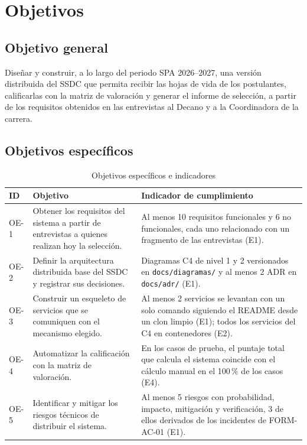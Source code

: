 \section{Objetivos}

\subsection{Objetivo general}
Diseñar y construir, a lo largo del periodo SPA 2026--2027, una versión distribuida del
SSDC que permita recibir las hojas de vida de los postulantes, calificarlas con la matriz
de valoración y generar el informe de selección, a partir de los requisitos obtenidos en
las entrevistas al Decano y a la Coordinadora de la carrera.

\subsection{Objetivos específicos}

\begin{table}[H]
\centering
\small
\caption{Objetivos específicos e indicadores}
\begin{tabularx}{\linewidth}{@{}p{0.9cm}XX@{}}
\toprule
\textbf{ID} & \textbf{Objetivo} & \textbf{Indicador de cumplimiento} \\
\midrule
OE-1 & Obtener los requisitos del sistema a partir de entrevistas a quienes realizan hoy la selección. &
Al menos 10 requisitos funcionales y 6 no funcionales, cada uno relacionado con un fragmento de las entrevistas (E1). \\
\midrule
OE-2 & Definir la arquitectura distribuida base del SSDC y registrar sus decisiones. &
Diagramas C4 de nivel 1 y 2 versionados en \texttt{docs/diagramas/} y al menos 2 ADR en \texttt{docs/adr/} (E1). \\
\midrule
OE-3 & Construir un esqueleto de servicios que se comuniquen con el mecanismo elegido. &
Al menos 2 servicios se levantan con un solo comando siguiendo el README desde un clon limpio (E1); todos los servicios del C4 en contenedores (E2). \\
\midrule
OE-4 & Automatizar la calificación con la matriz de valoración. &
En los casos de prueba, el puntaje total que calcula el sistema coincide con el cálculo manual en el 100\,\% de los casos (E4). \\
\midrule
OE-5 & Identificar y mitigar los riesgos técnicos de distribuir el sistema. &
Al menos 5 riesgos con probabilidad, impacto, mitigación y verificación, 3 de ellos derivados de los incidentes de FORM-AC-01 (E1). \\
\bottomrule
\end{tabularx}
\end{table}